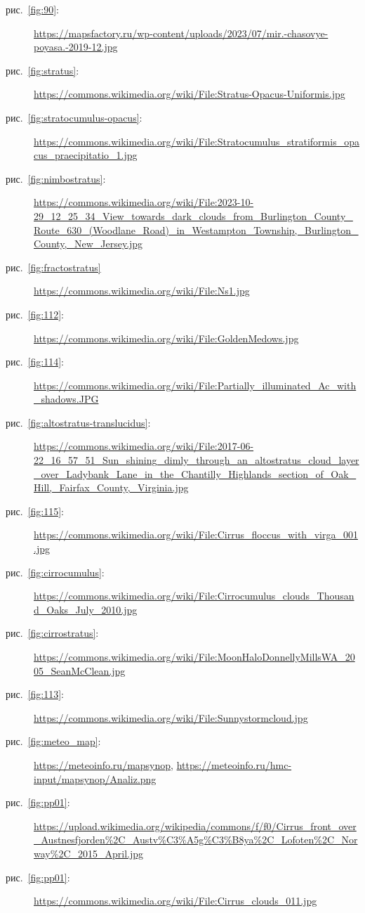 \documentclass[a4paper, 12pt, twoside, final, book, russian, fittopage, cyremdash, openright]{ncc}
\newcommand{\rris}[1]{рис.~\ref{fig:#1}}
\begin{document}
\begin{description}
\item [\rris{90}:] \url{https://mapsfactory.ru/wp-content/uploads/2023/07/mir.-chasovye-poyasa.-2019-12.jpg}
\item [\rris{stratus}:] \url{https://commons.wikimedia.org/wiki/File:Stratus-Opacus-Uniformis.jpg}
\item [\rris{stratocumulus-opacus}:]  \url{https://commons.wikimedia.org/wiki/File:Stratocumulus_stratiformis_opacus_praecipitatio_1.jpg}
\item [\rris{nimbostratus}:] \url{https://commons.wikimedia.org/wiki/File:2023-10-29_12_25_34_View_towards_dark_clouds_from_Burlington_County_Route_630_(Woodlane_Road)_in_Westampton_Township,_Burlington_County,_New_Jersey.jpg}
\item [\rris{fractostratus}] \url{https://commons.wikimedia.org/wiki/File:Ns1.jpg}
\item [\rris{112}:] \url{https://commons.wikimedia.org/wiki/File:GoldenMedows.jpg}
\item [\rris{114}:] \url{https://commons.wikimedia.org/wiki/File:Partially_illuminated_Ac_with_shadows.JPG}
\item[\rris{altostratus-translucidus}:] \url{https://commons.wikimedia.org/wiki/File:2017-06-22_16_57_51_Sun_shining_dimly_through_an_altostratus_cloud_layer_over_Ladybank_Lane_in_the_Chantilly_Highlands_section_of_Oak_Hill,_Fairfax_County,_Virginia.jpg}
\item[\rris{115}:] \url{https://commons.wikimedia.org/wiki/File:Cirrus_floccus_with_virga_001.jpg}
\item[\rris{cirrocumulus}:] \url{https://commons.wikimedia.org/wiki/File:Cirrocumulus_clouds_Thousand_Oaks_July_2010.jpg}
\item[\rris{cirrostratus}:] \url{https://commons.wikimedia.org/wiki/File:MoonHaloDonnellyMillsWA_2005_SeanMcClean.jpg}
\item[\rris{113}:] \url{https://commons.wikimedia.org/wiki/File:Sunnystormcloud.jpg}
\item[\rris{meteo_map}:] \url{https://meteoinfo.ru/mapsynop}, \url{https://meteoinfo.ru/hmc-input/mapsynop/Analiz.png}
\item[\rris{pp01}:] \url{https://upload.wikimedia.org/wikipedia/commons/f/f0/Cirrus_front_over_Austnesfjorden%2C_Austv%C3%A5g%C3%B8ya%2C_Lofoten%2C_Norway%2C_2015_April.jpg}
\item[\rris{pp01}:] \url{https://commons.wikimedia.org/wiki/File:Cirrus_clouds_011.jpg}
\end{description}
\end{document}
